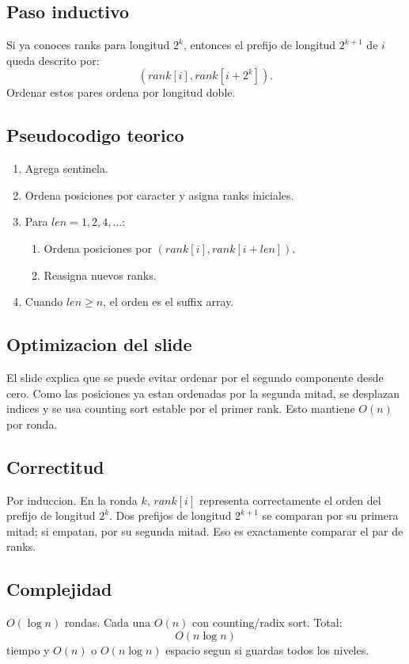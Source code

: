 \documentclass[10pt]{article}
\newcommand{\bigO}{O}
\begin{document}
\subsection{Paso inductivo}
Si ya conoces ranks para longitud $2^k$, entonces el prefijo de longitud
$2^{k+1}$ de $i$ queda descrito por:
\[
(rank[i], rank[i+2^k]).
\]
Ordenar estos pares ordena por longitud doble.

\subsection{Pseudocodigo teorico}
\begin{enumerate}[leftmargin=*]
\item Agrega sentinela.
\item Ordena posiciones por caracter y asigna ranks iniciales.
\item Para $len=1,2,4,\ldots$:
\begin{enumerate}
\item Ordena posiciones por $(rank[i],rank[i+len])$.
\item Reasigna nuevos ranks.
\end{enumerate}
\item Cuando $len\ge n$, el orden es el suffix array.
\end{enumerate}

\subsection{Optimizacion del slide}
El slide explica que se puede evitar ordenar por el segundo componente desde
cero. Como las posiciones ya estan ordenadas por la segunda mitad, se desplazan
indices y se usa counting sort estable por el primer rank. Esto mantiene
$\bigO(n)$ por ronda.

\subsection{Correctitud}
Por induccion. En la ronda $k$, $rank[i]$ representa correctamente el orden del
prefijo de longitud $2^k$. Dos prefijos de longitud $2^{k+1}$ se comparan por
su primera mitad; si empatan, por su segunda mitad. Eso es exactamente comparar
el par de ranks.

\subsection{Complejidad}
$\bigO(\log n)$ rondas. Cada una $\bigO(n)$ con counting/radix sort. Total:
\[
\bigO(n\log n)
\]
tiempo y $\bigO(n)$ o $\bigO(n\log n)$ espacio segun si guardas todos los niveles.
\end{document}
